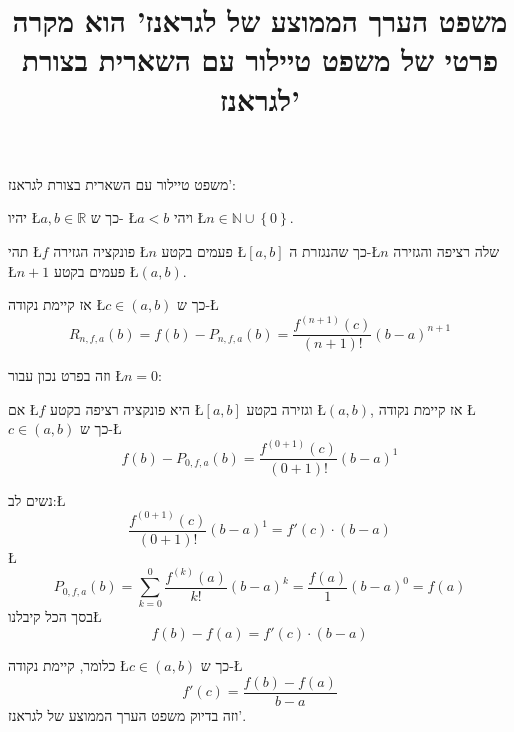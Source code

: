 \documentclass[english,hebrew]{article}
\begin{document}
\title{משפט הערך הממוצע של לגראנז' הוא מקרה פרטי של משפט טיילור עם השארית
בצורת לגראנז'}

\maketitle
משפט טיילור עם השארית בצורת לגראנז':

יהיו \L{$a,b\in\mathbb{R}$} כך ש- \L{$a<b$} ויהי \L{$n\in\mathbb{N}\cup\left\{ 0\right\} $}.

תהי \L{$f$} פונקציה הגזירה \L{$n$} פעמים בקטע \L{$\left[a,b\right]$}
כך שהנגזרת ה-\L{$n$} שלה רציפה והגזירה \L{$n+1$} פעמים בקטע \L{$\left(a,b\right)$}.

אז קיימת נקודה \L{$c\in\left(a,b\right)$} כך ש-\L{%
\[
R_{n,f,a}\left(b\right)=f(b)-P_{n,f,a}\left(b\right)=\frac{f^{\left(n+1\right)}(c)}{\left(n+1\right)!}\left(b-a\right)^{n+1}
\]
}%

וזה בפרט נכון עבור \L{$n=0$}:

אם \L{$f$} היא פונקציה רציפה בקטע \L{$\left[a,b\right]$} וגזירה
בקטע \L{$\left(a,b\right)$}, אז קיימת נקודה \L{$c\in\left(a,b\right)$}
כך ש-\L{%
\[
f(b)-P_{0,f,a}\left(b\right)=\frac{f^{\left(0+1\right)}(c)}{\left(0+1\right)!}\left(b-a\right)^{1}
\]
}%

נשים לב:\L{%
\[
\frac{f^{\left(0+1\right)}(c)}{\left(0+1\right)!}\left(b-a\right)^{1}=f'(c)\cdot\left(b-a\right)
\]
}%
\L{%
\[
P_{0,f,a}\left(b\right)=\underset{k=0}{\overset{0}{\sum}}\frac{f^{(k)}(a)}{k!}\left(b-a\right)^{k}=\frac{f(a)}{1}\left(b-a\right)^{0}=f(a)
\]
}%
 בסך הכל קיבלנו\L{%
\[
f(b)-f(a)=f'(c)\cdot\left(b-a\right)
\]
}%

כלומר, קיימת נקודה \L{$c\in\left(a,b\right)$} כך ש-\L{%
\[
f'(c)=\frac{f(b)-f(a)}{b-a}
\]
}%
 וזה בדיוק משפט הערך הממוצע של לגראנז'. 
\end{document}

